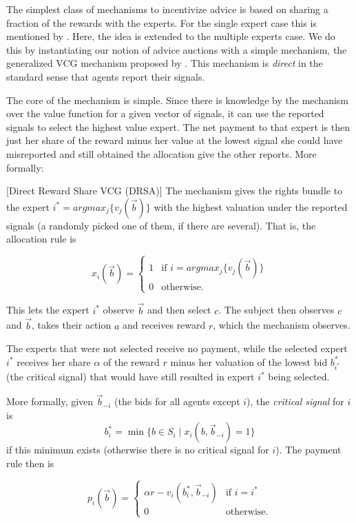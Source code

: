 The simplest class of mechanisms to incentivize advice is based on sharing a fraction of the rewards with the experts. For the single expert case this is mentioned by \citep{othman2010decision}. Here, the idea is extended to the multiple experts case. We do this by instantiating our notion of advice auctions with a simple mechanism,
the generalized VCG mechanism proposed by \citep{maskin1992auctions}. This mechanism is \emph{direct} in the standard sense that agents report their signals. 

The core of the mechanism is simple. Since there is knowledge by the mechanism over the value function for a given vector of signals, it can use the reported signals to select the highest value expert. The net payment to that expert is then just her share of the reward minus her value at the lowest signal she could have misreported and still obtained the allocation give the other reports. More formally:

\begin{mech}\label{mech:Direct}[Direct Reward Share VCG (DRSA)]
   The mechanism gives the rights bundle to the expert $i^*=argmax_j \{v_j(\vec b)\} $ with the highest valuation under the reported signals (a randomly picked one of them, if there are several).
   That is, the allocation rule is

   $$x_i(\vec{b}) = \begin{cases} 1 & \text{if } i = argmax_j \{v_j(\vec b)\}  \\ 0 & \text{otherwise.} \end{cases}$$

This lets the expert $i^*$ observe  $\vec{b}$ and then select $c$.
The subject then observes $c$ and $\vec{b}$, takes their action $a$ and receives reward $r$, which the mechanism observes. 

   The experts that were not selected receive no payment, while the selected expert $i^*$ receives her share $\alpha$ of the reward $r$ minus her valuation of the lowest bid $b_{i^*}^*$ (the critical signal) that would have still resulted in expert $i^*$ being selected.

More formally, given $\vec{b}_{-i}$ (the bids for all agents except $i$), the {\sl critical signal} for $i$ is
$$b_i^* = \min\{b\in S_i\mid x_i(b,\vec b_{-i})=1\}$$
if this minimum exists (otherwise there is no critical signal for $i$).
The payment rule then is

   $$p_i(\vec b)= \begin{cases}  \alpha r - v_i(b_i^*,\vec{b}_{-i})& \text{if }i = i^* \\ 0 & \text{otherwise.} \end{cases}$$

\end{mech}

